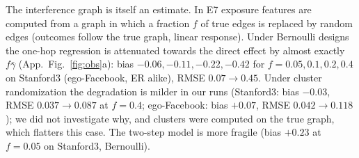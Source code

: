 The interference graph is itself an estimate. In E7 exposure features are computed from a graph in which a fraction $f$ of true edges is replaced by random edges (outcomes follow the true graph, linear response). Under Bernoulli designs the one-hop regression is attenuated towards the direct effect by almost exactly $f\bar\gamma$ (App.\ Fig.~\ref{fig:obs}a): bias $-0.06,-0.11,-0.22,-0.42$ for $f=0.05,0.1,0.2,0.4$ on Stanford3 (ego-Facebook, ER alike), RMSE $0.07\to0.45$. Under cluster randomization the degradation is milder in our runs (Stanford3: bias $-0.03$, RMSE $0.037\to0.087$ at $f=0.4$; ego-Facebook: bias $+0.07$, RMSE $0.042\to0.118$); we did not investigate why, and clusters were computed on the true graph, which flatters this case. The two-step model is more fragile (bias $+0.23$ at $f=0.05$ on Stanford3, Bernoulli).

